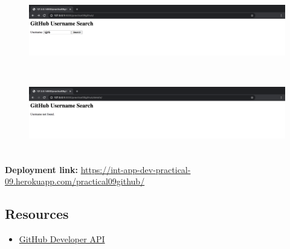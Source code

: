 \documentclass{article}
\begin{document}
\begin{figure}[H]
  \includegraphics[width=175mm, height=35mm]{./img/09-expected-github-4.png}
  \includegraphics[width=175mm, height=35mm]{./img/09-expected-github-5.png}
\end{figure}

\textbf{Deployment link:} \href{https://int-app-dev-practical-09.herokuapp.com/practical09github/}{https://int-app-dev-practical-09.herokuapp.com/practical09github/}

\subsection*{Resources} 
\begin{itemize}
  \item \href{https://developer.github.com/v3/}{GitHub Developer API}
\end{itemize}
\end{document}
